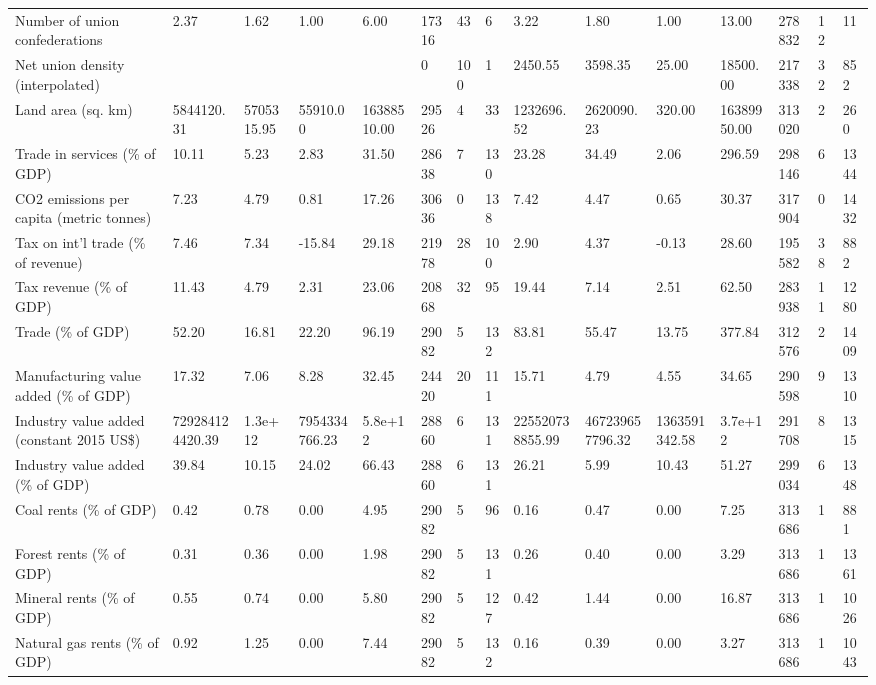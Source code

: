 \begin{longtable}{lllllllllllllll}
Number of union confederations & 2.37 & 1.62 & 1.00 & 6.00 & 17316 & 43 & 6 & 3.22 & 1.80 & 1.00 & 13.00 & 278832 & 12 & 11\\
Net union density (interpolated) &  &  &  &  & 0 & 100 & 1 & 2450.55 & 3598.35 & 25.00 & 18500.00 & 217338 & 32 & 852\\
Land area (sq. km) & 5844120.31 & 5705315.95 & 55910.00 & 16388510.00 & 29526 & 4 & 33 & 1232696.52 & 2620090.23 & 320.00 & 16389950.00 & 313020 & 2 & 260\\
\addlinespace
Trade in services (\% of GDP) & 10.11 & 5.23 & 2.83 & 31.50 & 28638 & 7 & 130 & 23.28 & 34.49 & 2.06 & 296.59 & 298146 & 6 & 1344\\
CO2 emissions per capita (metric tonnes) & 7.23 & 4.79 & 0.81 & 17.26 & 30636 & 0 & 138 & 7.42 & 4.47 & 0.65 & 30.37 & 317904 & 0 & 1432\\
Tax on int'l trade (\% of revenue) & 7.46 & 7.34 & -15.84 & 29.18 & 21978 & 28 & 100 & 2.90 & 4.37 & -0.13 & 28.60 & 195582 & 38 & 882\\
Tax revenue (\% of GDP) & 11.43 & 4.79 & 2.31 & 23.06 & 20868 & 32 & 95 & 19.44 & 7.14 & 2.51 & 62.50 & 283938 & 11 & 1280\\
Trade (\% of GDP) & 52.20 & 16.81 & 22.20 & 96.19 & 29082 & 5 & 132 & 83.81 & 55.47 & 13.75 & 377.84 & 312576 & 2 & 1409\\
\addlinespace
Manufacturing value added (\% of GDP) & 17.32 & 7.06 & 8.28 & 32.45 & 24420 & 20 & 111 & 15.71 & 4.79 & 4.55 & 34.65 & 290598 & 9 & 1310\\
Industry value added (constant 2015 US\$) & 729284124420.39 & 1.3e+12 & 7954334766.23 & 5.8e+12 & 28860 & 6 & 131 & 225520738855.99 & 467239657796.32 & 1363591342.58 & 3.7e+12 & 291708 & 8 & 1315\\
Industry value added (\% of GDP) & 39.84 & 10.15 & 24.02 & 66.43 & 28860 & 6 & 131 & 26.21 & 5.99 & 10.43 & 51.27 & 299034 & 6 & 1348\\
Coal rents (\% of GDP) & 0.42 & 0.78 & 0.00 & 4.95 & 29082 & 5 & 96 & 0.16 & 0.47 & 0.00 & 7.25 & 313686 & 1 & 881\\
Forest rents (\% of GDP) & 0.31 & 0.36 & 0.00 & 1.98 & 29082 & 5 & 131 & 0.26 & 0.40 & 0.00 & 3.29 & 313686 & 1 & 1361\\
\addlinespace
Mineral rents (\% of GDP) & 0.55 & 0.74 & 0.00 & 5.80 & 29082 & 5 & 127 & 0.42 & 1.44 & 0.00 & 16.87 & 313686 & 1 & 1026\\
Natural gas rents (\% of GDP) & 0.92 & 1.25 & 0.00 & 7.44 & 29082 & 5 & 132 & 0.16 & 0.39 & 0.00 & 3.27 & 313686 & 1 & 1043\\

\end{longtable}
